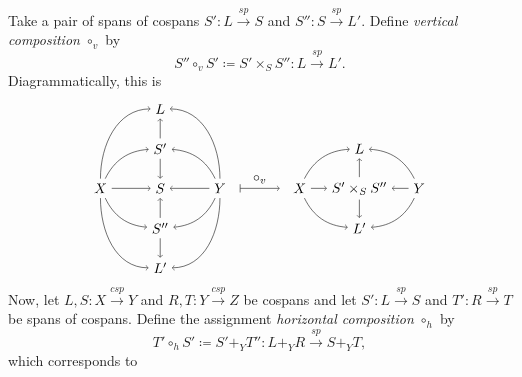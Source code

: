 \documentclass{tac}
\newcommand{\from}{\colon}
\renewcommand{\span}{\xrightarrow{\mathit{sp}}}
\newcommand{\cospan}{\xrightarrow{\mathit{csp}}}
\begin{document}
Take a pair of spans of cospans 
	$ S ' \from L \span S $ 
and 
	$ S '' \from S \span L ' $. 
Define \textit{vertical composition} $ \circ_v $ by 
	\begin{equation} \label{eq.VertComp}
			S'' \circ_v S' \coloneqq S' \times_S S'' \from L \span L'.
	\end{equation}
Diagrammatically, this is
\[
	\begin{tikzpicture}
	\node (X) at (-4,0) {$X$};
	\node (Y) at (-1,0) {$Y$};
	\node (L) at (-2.5,2) {$L$};
	\node (S') at (-2.5,1) {$S'$};
	\node (S) at (-2.5,0) {$S$};
	\node (S'') at (-2.5,-1) {$S''$};
	\node (L') at (-2.5,-2) {$L'$};
	\draw [->] (X) edge[out=90,in=180] (L);
	\draw [->] (X) edge[bend left=30] (S');
	\draw [->] (X) edge (S);
	\draw [->] (X) edge[bend right=30] (S'');
	\draw [->] (X) edge[out=-90,in=180] (L');
	\draw [->] (Y) edge[out=90,in=0] (L);
	\draw [->] (Y) edge[bend right=30] (S');
	\draw [->] (Y) edge (S);
	\draw [->] (Y) edge[bend left=30] (S'');
	\draw [->] (Y) edge[out=-90,in=0] (L');
	\draw [->] (S') edge (L);
	\draw [->] (S') edge (S);
	\draw [->] (S'') edge (S);
	\draw [->] (S'') edge (L');
	\draw [|->] (-0.5,0) -- node[above] {$\circ_v$} (0.5,0);
	\node (X) at (1,0) {$X$};
	\node (Y) at (4,0) {$Y$};
	\node (L) at (2.5,1) {$L$};
	\node (L') at (2.5,-1) {$L'$};
	\node (Spb) at (2.5,0) {$S' \times_S S''$};
	\draw [->] (X) edge[bend left=30] (L);
	\draw [->] (X) edge[] (Spb);
	\draw [->] (X) edge[bend right=30] (L');
	\draw [->] (Y) edge[bend right=30] (L);
	\draw [->] (Y) edge[] (Spb);
	\draw [->] (Y) edge[bend left=30] (L');
	\draw [->] (Spb) edge[] (L);
	\draw [->] (Spb) edge[] (L');
	\end{tikzpicture}
\]
Now, let 
	$ L , S \from X \cospan Y $ 
and 
	$ R , T \from Y \cospan Z $ 
be cospans and let 
	$ S ' \from L \span S $ 
and 
	$ T ' \from R \span T $  
be spans of cospans.  Define the assignment 
\textit{horizontal composition} $ \circ_h $ by 
	\begin{equation} \label{eq.HorComp}
		T' \circ_h S' \coloneqq 
		S' +_Y T'' \from L +_Y R \span S +_Y T,
	\end{equation} 
which corresponds to 
\end{document}
